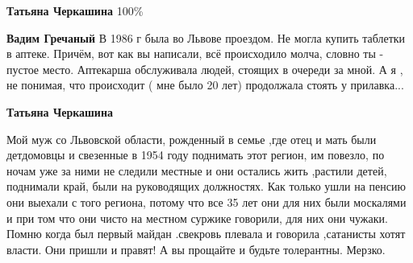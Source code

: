 \begin{itemize}
\begin{itemize}
\textbf{Татьяна Черкашина} 100\%

 
\textbf{Вадим Гречаный} В 1986 г была во Львове проездом. Не могла купить
таблетки в аптеке. Причём, вот как вы написали, всё происходило молча, словно
ты - пустое место. Аптекарша обслуживала людей, стоящих в очереди за мной. А я
, не понимая, что происходит ( мне было 20 лет) продолжала стоять у прилавка...

 
\textbf{Татьяна Черкашина} 

Мой муж со Львовской области, рожденный в семье ,где
отец и мать были детдомовцы и свезенные в 1954 году поднимать этот регион, им
повезло, по ночам уже за ними не следили местные и они остались жить ,растили
детей, поднимали край, были на руководящих должностях. Как только ушли на пенсию
они выехали с того региона, потому что все 35 лет они для них были москалями и
при том что они чисто на местном суржике говорили, для них они чужаки. Помню
когда был первый майдан .свекровь плевала и говорила ,сатанисты хотят
власти. Они пришли и правят! А вы прощайте и будьте толерантны. Мерзко.

\end{itemize}

\end{itemize}

